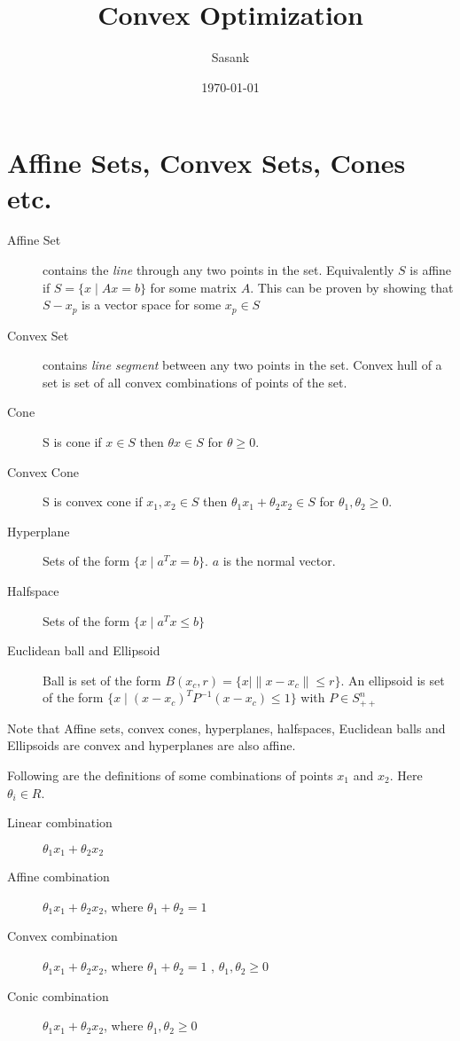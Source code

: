 \documentclass[a4paper,11pt]{article}
\begin{document}
\title{Convex Optimization}
\author{Sasank}
\date{\today}
\maketitle

\section{Affine Sets, Convex Sets, Cones etc.}
\begin{description}
\item[Affine Set] contains the \emph{line} through any two points in the set. Equivalently $S$ is affine if $S = \{x \mid Ax = b\}$ for some matrix $A$. This can be proven by showing that $S - x_p$ is a vector space for some $x_p \in S$

\item[Convex Set] contains \emph{line segment} between any two points in the set. Convex hull of a set is set of all convex combinations of points of the set. 

\item[Cone] S is cone if $x \in S$ then $\theta x \in S$ for $\theta \geq 0$. 

\item[Convex Cone] S is convex cone if $x_1, x_2 \in S$ then $\theta_1 x_1 + \theta_2 x_2 \in S$ for $\theta_1,\theta_2 \geq 0$. 

\item[Hyperplane] Sets of the form $\{x \mid a^Tx = b\}$. $a$ is the normal vector.

\item[Halfspace] Sets of the form $\{x \mid a^Tx \leq b\}$

\item[Euclidean ball and Ellipsoid] Ball is set of the form $B(x_c,r) = \{ x \mid \|x-x_c\| \leq r\}$. An ellipsoid is set of the form $\{x \mid (x-x_c)^TP^{-1}(x-x_c) \leq 1 \}$ with $P \in S^n_{++}$

\end{description}

Note that Affine sets, convex cones, hyperplanes, halfspaces, Euclidean balls and Ellipsoids are convex and hyperplanes are also affine.

Following are the definitions of some combinations of points $x_1$ and $x_2$. Here $\theta_i \in R$.
\begin{description}
\item[Linear combination] $\theta_1 x_1 + \theta_2 x_2 $
\item[Affine combination] $\theta_1 x_1 + \theta_2 x_2 $, where $\theta_1 + \theta_2 = 1 $ 
\item[Convex combination] $\theta_1 x_1 + \theta_2 x_2 $, where $\theta_1 + \theta_2 = 1 $ , $\theta_1, \theta_2 \geq 0$
\item[Conic combination] $\theta_1 x_1 + \theta_2 x_2 $, where $\theta_1, \theta_2 \geq 0$
\end{description}
\end{document}
